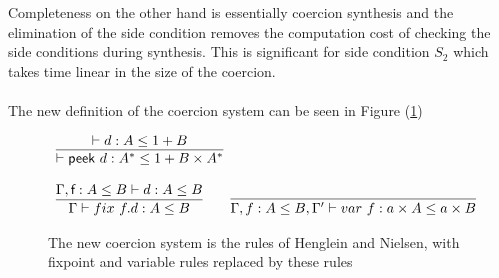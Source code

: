 \documentclass[a4paper,UKenglish,cleveref, autoref, thm-restate]{lipics-v2021}
\begin{document}
Completeness on the other hand is essentially coercion synthesis and the elimination of the side condition removes the computation cost of checking the side conditions during synthesis. This is significant for side condition $S_2$ which takes time linear in the size of the coercion.\\\\
The new definition of the coercion system can be seen in Figure (\ref{fig:system})
\begin{figure}
\caption{The new coercion system is the rules of Henglein and Nielsen, with fixpoint and variable rules replaced by these rules}
\label{fig:system}
\centering
\begin{displaymath}
\begin{array}{lll}



\infer{\contains{}{\dslcom{peek}~d}{A^*}{1 + B \times A^*}}{\contains{}{d}{A}{1 + B}} \qquad
\\\\
\infer{\contains{\Gamma}{\fix ~f.d}{A}{B}}{ \contains{\Gamma, \dslcom{f}: A \leq B}{d}{A}{B}} \qquad
\infer{\contains{\Gamma, \mathsf{f} : A \leq B, \Gamma'}{var~f}{a \times A}{a \times B}}{}
\end{array}
\end{displaymath}
\end{figure}
\end{document}
